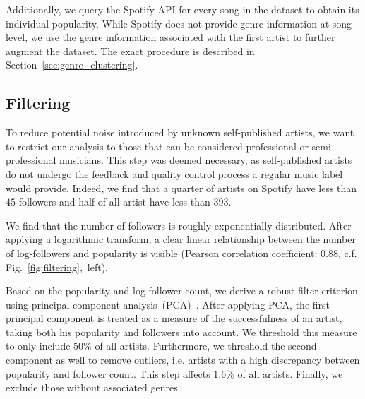 \documentclass{article}
\begin{document}
Additionally, we query the Spotify API for every song in the dataset to obtain its individual popularity. While Spotify does not provide genre information at song level, we use the genre information associated with the first artist to further augment the dataset. The exact procedure is described in Section~\ref{sec:genre_clustering}. 

\subsection{Filtering}


To reduce potential noise introduced by unknown self-published artists, we want to restrict our analysis to those that can be considered professional or semi-professional musicians. This step was deemed necessary, as self-published artists do not undergo the feedback and quality control process a regular music label would provide. Indeed, we find that a quarter of artists on Spotify have less than $45$ followers and half of all artist have less than $393$.

We find that the number of followers is roughly exponentially distributed. After applying a logarithmic transform, a clear linear relationship between the number of log-followers and popularity is visible (Pearson correlation coefficient: $0.88$, c.f. Fig.~\ref{fig:filtering},~left). 

Based on the popularity and log-follower count, we derive a robust filter criterion using principal component analysis~(PCA)~\cite{jolliffe2016principal}. After applying PCA, the first principal component is treated as a measure of the successfulness of an artist, taking both his popularity and followers into account. We threshold this measure to only include $50\%$ of all artists. Furthermore, we threshold the second component as well to remove outliers, i.e. artists with a high discrepancy between popularity and follower count. This step affects $1.6\%$ of all artists. Finally, we exclude those without associated genres.
\end{document}

